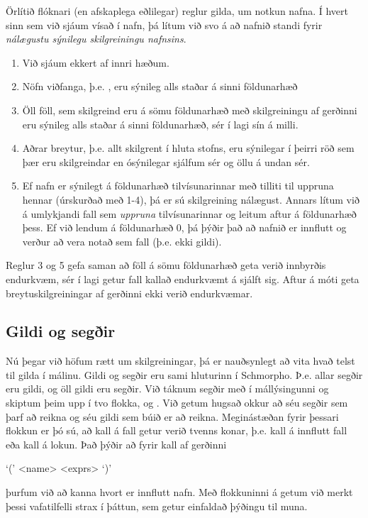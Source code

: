 \documentclass[a4paper,icelandic]{article}
\begin{document}
Örlítið flóknari (en afskaplega eðlilegar) reglur gilda, um notkun
nafna. Í hvert sinn sem við sjáum vísað í nafn, þá lítum við svo á að
nafnið standi fyrir \emph{nálægustu sýnilegu skilgreiningu nafnsins}.
\begin{enumerate}
\item Við sjáum ekkert af innri hæðum.
\item Nöfn viðfanga, þ.e. , eru sýnileg alls staðar á sinni
  földunarhæð
\item Öll föll, sem skilgreind eru á sömu földunarhæð með
  skilgreiningu af gerðinni  eru sýnileg alls staðar á
  sinni földunarhæð, sér í lagi sín á milli.
\item Aðrar breytur, þ.e. allt skilgrent í  hluta stofns,
  eru sýnilegar í þeirri röð sem þær eru skilgreindar en ósýnilegar
  sjálfum sér og öllu á undan sér.
\item Ef nafn er sýnilegt á földunarhæð tilvísunarinnar með tilliti
  til uppruna hennar (úrskurðað með 1-4), þá er sú skilgreining
  nálægust. Annars lítum við á umlykjandi fall sem \emph{uppruna}
  tilvísunarinnar og leitum aftur á földunarhæð þess. Ef við lendum á
  földunarhæð 0, þá þýðir það að nafnið er innflutt og verður að vera
  notað sem fall (þ.e. ekki gildi).
\end{enumerate}
Reglur 3 og 5 gefa saman að föll á sömu földunarhæð geta verið
innbyrðis endurkvæm, sér í lagi getur fall kallað endurkvæmt á sjálft
sig. Aftur á móti geta breytuskilgreiningar af gerðinni 
ekki verið endurkvæmar.



\subsection{Gildi og segðir}
\label{sec:gildi}
Nú þegar við höfum rætt um skilgreiningar, þá er nauðsynlegt að vita
hvað telst til gilda í málinu. Gildi og segðir eru sami hluturinn í
Schmorpho. Þ.e. allar segðir eru gildi, og öll gildi eru segðir. Við
táknum segðir með  í mállýsingunni og skiptum þeim upp í
tvo flokka,  og . Við getum hugsað okkur að
 séu segðir sem þarf að reikna og  séu gildi
sem búið er að reikna. Meginástæðan fyrir þessari flokkun er þó sú, að
kall á fall getur verið tvenns konar, þ.e. kall á innflutt fall eða
kall á lokun. Það þýðir að fyrir kall af gerðinni
\begin{syntdiag*}
  `(' <name> <exprs> `)' 
\end{syntdiag*}
þurfum við að kanna hvort  er innflutt nafn. Með flokkuninni
á  getum við merkt þessi vafatilfelli strax í þáttun, sem
getur einfaldað þýðingu til muna.
\end{document}
